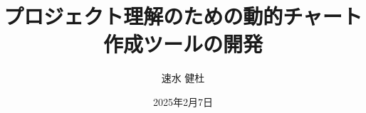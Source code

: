 \documentclass[12pt,twoside]{jbook}
\begin{document}
\title{
プロジェクト理解のための動的チャート作成ツールの開発
}


\author{%
  速水 健杜
}

\date{2025年2月7日}






\maketitle


\begin{abstract}

\end{abstract}

\begin{acknowledgments}


\end{acknowledgments}


\tableofcontents       %

%
%

\listoffigures         %
\listoftables          %

\end{document}
